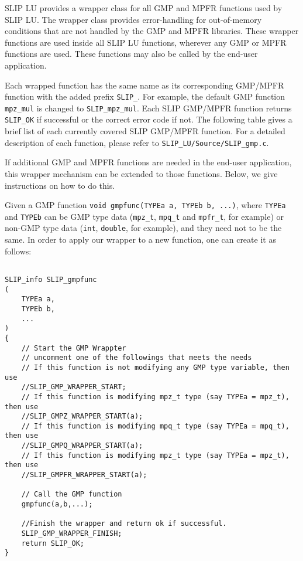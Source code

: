 \documentclass[12pt]{article}
\theoremstyle{definition}
\begin{document}
SLIP LU provides a wrapper class for all GMP and MPFR functions used by SLIP
LU.  The wrapper class provides error-handling for out-of-memory conditions
that are not handled by the GMP and MPFR libraries.  These wrapper functions
are used inside all SLIP LU functions, wherever any GMP or MPFR functions are
used.  These functions may also be called by the end-user application.

Each wrapped function has the same name as its corresponding GMP/MPFR function
with the added prefix \verb|SLIP_|. For example, the default GMP function
\verb|mpz_mul| is changed to \verb|SLIP_mpz_mul|. Each SLIP GMP/MPFR function
returns \verb|SLIP_OK| if successful or the correct error code if not. The
following table gives a brief list of each currently covered SLIP GMP/MPFR
function. For a detailed description of each function, please refer to
\verb|SLIP_LU/Source/SLIP_gmp.c|.

If additional GMP and MPFR functions are needed in the end-user application,
this wrapper mechanism can be extended to those functions.  Below, we give
instructions on how to do this.

Given a GMP function \verb|void gmpfunc(TYPEa a, TYPEb b, ...)|, where
\verb|TYPEa| and \verb|TYPEb| can be GMP type data (\verb|mpz_t|,
\verb|mpq_t| and \verb|mpfr_t|, for example) or non-GMP type data (\verb|int|,
\verb|double|, for example), and they need not to be the same. In order to
apply our wrapper to a new function, one can create it as follows:

\begin{mdframed}[userdefinedwidth=6in]
{\footnotesize
\begin{verbatim}

SLIP_info SLIP_gmpfunc
(
    TYPEa a,
    TYPEb b,
    ...
)
{
    // Start the GMP Wrappter
    // uncomment one of the followings that meets the needs
    // If this function is not modifying any GMP type variable, then use
    //SLIP_GMP_WRAPPER_START;
    // If this function is modifying mpz_t type (say TYPEa = mpz_t), then use
    //SLIP_GMPZ_WRAPPER_START(a);
    // If this function is modifying mpq_t type (say TYPEa = mpq_t), then use
    //SLIP_GMPQ_WRAPPER_START(a);
    // If this function is modifying mpz_t type (say TYPEa = mpz_t), then use
    //SLIP_GMPFR_WRAPPER_START(a);

    // Call the GMP function
    gmpfunc(a,b,...);

    //Finish the wrapper and return ok if successful.
    SLIP_GMP_WRAPPER_FINISH;
    return SLIP_OK;
}
\end{verbatim}
} \end{mdframed}
\end{document}

